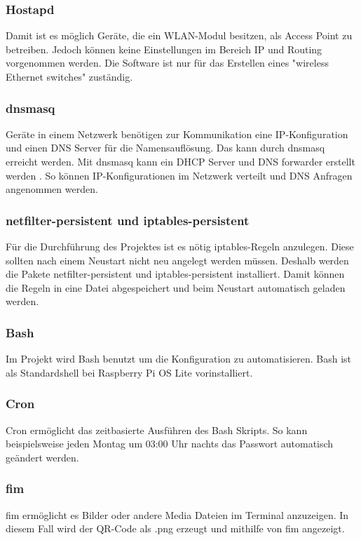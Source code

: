 \documentclass[a4paper,11pt,singlespacing]{article}
\begin{document}
    		\subsubsection{Hostapd}
        		Damit ist es möglich Geräte, die ein WLAN-Modul besitzen, als Access Point zu betreiben. Jedoch können keine Einstellungen im Bereich IP und Routing vorgenommen werden. Die Software ist nur für das Erstellen eines "wireless Ethernet switches" zuständig. \cite{Quote_hostapd1} \cite{Quote_hostapd_man}
    		\subsubsection{dnsmasq}
        		Geräte in einem Netzwerk benötigen zur Kommunikation eine IP-Konfiguration und einen DNS Server für die Namensauflösung. Das kann durch dnsmasq erreicht werden. Mit dnsmasq kann ein DHCP Server und DNS forwarder erstellt werden \cite{Quote_dnsmasq}. So können IP-Konfigurationen  im Netzwerk verteilt und DNS Anfragen angenommen werden. 
    		\subsubsection{netfilter-persistent und iptables-persistent}
        		Für die Durchführung des Projektes ist es nötig iptables-Regeln anzulegen. Diese sollten nach einem Neustart nicht neu angelegt werden müssen. Deshalb werden die Pakete netfilter-persistent und iptables-persistent installiert. Damit können die Regeln in eine Datei abgespeichert und beim Neustart automatisch geladen werden.\cite{Quote_iptables} \cite{Quote_netfilter}
        	\subsubsection{Bash}
        		Im Projekt wird Bash benutzt um die Konfiguration zu automatisieren. Bash ist als Standardshell bei Raspberry Pi OS Lite vorinstalliert. 
    		\subsubsection{Cron}
				Cron ermöglicht das zeitbasierte Ausführen des Bash Skripts. So kann beispielsweise jeden Montag um 03:00 Uhr nachts das Passwort automatisch geändert werden.
			\subsubsection{fim}
				fim ermöglicht es Bilder oder andere Media Dateien im Terminal anzuzeigen. In diesem Fall wird der QR-Code als .png erzeugt und mithilfe von fim angezeigt. \cite{Quote_man_fim}
\end{document}
